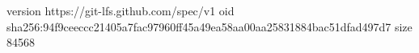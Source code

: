 version https://git-lfs.github.com/spec/v1
oid sha256:94f9ceeccc21405a7fac97960ff45a49ea58aa00aa25831884bac51dfad497d7
size 84568
